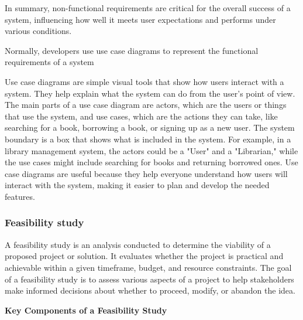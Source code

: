 \documentclass[a4paper]{article}
\begin{document}
In summary, non-functional requirements are critical for the overall success of a system, influencing how well it meets user expectations 
and performs under various conditions.

Normally, developers use use case diagrams to represent the functional requirements of a system

Use case diagrams are simple visual tools that show how users interact with a system. They help explain what the system can do from the user's point of view. The main parts 
of a use case diagram are actors, which are the users or things that use the system, and use cases, which are the actions they can
take, like searching for a book, borrowing a book, or signing up as a new user. The system boundary is a box that shows what is included in the system. For example, in a library management system, the actors could be a "User" and a "Librarian," while the use cases might include searching for books and returning borrowed ones. Use case diagrams are useful because they help everyone understand how users will interact with the system, making it easier to plan and develop the needed features.



\subsubsection{Feasibility study}

A feasibility study is an analysis conducted to determine the viability of a proposed project or solution. It evaluates whether 
the project is practical and achievable within a given timeframe, budget, and resource constraints. The goal of a feasibility study is to
assess various aspects of a project to help stakeholders make informed decisions about whether to proceed, modify, or abandon the idea.

\textbf{Key Components of a Feasibility Study}
\end{document}
